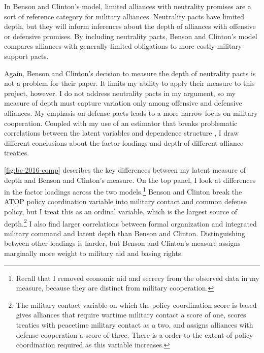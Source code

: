 \documentclass[12pt]{article}
\begin{document}
In Benson and Clinton's model, limited alliances with neutrality promises are a sort of reference category for military alliances. 
Neutrality pacts have limited depth, but they will inform inferences about the depth of alliances with offensive or defensive promises. 
By including neutrality pacts, Benson and Clinton's model compares alliances with generally limited obligations to more costly military support pacts.


Again, Benson and Clinton's decision to measure the depth of neutrality pacts is not a problem for their paper. 
It limits my ability to apply their measure to this project, however. 
I do not address neutrality pacts in my argument, so my measure of depth must capture variation only among offensive and defensive alliances. 
My emphasis on defense pacts leads to a more narrow focus on military cooperation.
Coupled with my use of an estimator that breaks problematic correlations between the latent variables and dependence structure \citep{Murrayetal2013}, I draw different conclusions about the factor loadings and depth of different alliance treaties. 


\autoref{fig:bc-2016-comp} describes the key differences between my latent measure of depth and Benson and Clinton's measure.
On the top panel, I look at differences in the factor loadings across the two models.\footnote{Recall that I removed economic aid and secrecy from the observed data in my measure, because they are distinct from military cooperation.} 
Benson and Clinton break the ATOP policy coordination variable into military contact and common defense policy, but I treat this as an ordinal variable, which is the largest source of depth.\footnote{The military contact variable on which the policy coordination score is based gives alliances that require wartime military contact a score of one, scores treaties with peacetime military contact as a two, and assigns alliances with defense cooperation a score of three. There is a order to the extent of policy coordination required as this variable increases.}
I also find larger correlations between formal organization and integrated military command and latent depth than Benson and Clinton.
Distinguishing between other loadings is harder, but Benson and Clinton's measure assigns marginally more weight to military aid and basing rights.  
\end{document}
